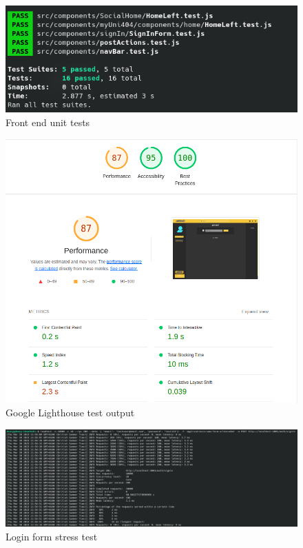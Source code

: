 \documentclass[lettersize,journal]{IEEEtran}
\begin{document}
	\begin{figure}[h!]
		\centering
                \includegraphics[width=0.4\paperwidth]{images/unittests.png}
                \caption{Front end unit tests}
                \label{figure 3}
	\end{figure}
	\begin{figure}[h!]
		\centering
                \includegraphics[width=0.4\paperwidth]{images/lighthouse.png}
                \caption{Google Lighthouse test output}
                \label{figure 3}
	\end{figure}
	\begin{figure}[h!]
		\centering
                \includegraphics[width=0.85\paperwidth]{images/stresstest.png}
		\caption{Login form stress test}
                \label{figure 3}
	\end{figure}
\clearpage
\newpage
\end{document}
